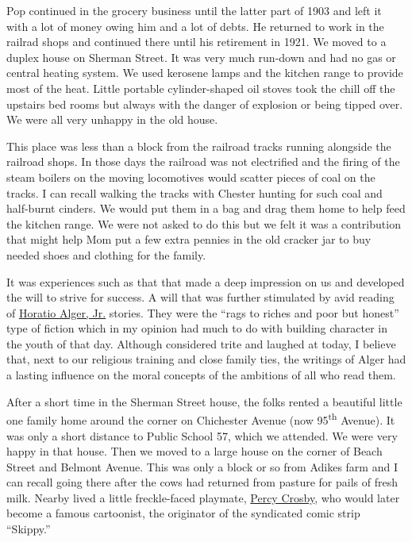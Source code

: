 \documentclass[12pt]{book}              %
\begin{document}

Pop continued in the grocery business until the latter part of 1903 and left it with a lot of money owing him and a lot of debts. He returned to work in the railrad shops and continued there until his retirement in 1921. We moved to a duplex house on Sherman Street. It was very much run-down and had no gas or central heating system. We used kerosene lamps and the kitchen range to provide most of the heat. Little portable cylinder-shaped oil stoves took the chill off the upstairs bed rooms but always with the danger of explosion or being tipped over. We were all very unhappy in the old house.

This place was less than a block from the railroad tracks running alongside the railroad shops. In those days the railroad was not electrified and the firing of the steam boilers on the moving locomotives would scatter pieces of coal on the tracks. I can recall walking the tracks with Chester hunting for such coal and half-burnt cinders. We would put them in a bag and drag them home to help feed the kitchen range. We were not asked to do this but we felt it was a contribution that might help Mom put a few extra pennies in the old cracker jar to buy needed shoes and clothing for the family. 

It was experiences such as that that made a deep impression on us and developed the will to strive for success. A will that was further stimulated by avid reading of \href{http://en.wikipedia.org/wiki/Horatio_Alger,_Jr.}{Horatio Alger, Jr.} stories. They were the ``rags to riches and poor but honest'' type of fiction which in my opinion had much to do with building character in the youth of that day. Although considered trite and laughed at today, I believe that, next to our religious training and close family ties, the writings of Alger had a lasting influence on the moral concepts of the ambitions of all who read them.

After a short time in the Sherman Street house, the folks rented a beautiful little one family home around the corner on Chichester Avenue (now 95\textsuperscript{th} Avenue).  It was only a short distance to Public School 57, which we attended. We were very happy in that house. Then we moved to a large house on the corner of Beach Street and Belmont Avenue. This was only a block or so from Adikes farm and I can recall going there after the cows had returned from pasture for pails of fresh milk. Nearby lived a little freckle-faced playmate, \href{http://en.wikipedia.org/wiki/Percy_Crosby}{Percy Crosby}, who would later become a famous cartoonist, the originator of the syndicated comic strip ``Skippy.'' 
\end{document}
